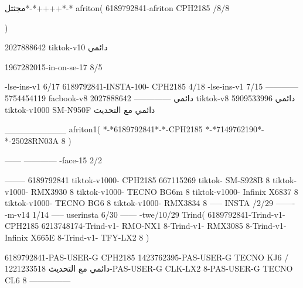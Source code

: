 مجثثل*-*++++*-*
afriton(
6189792841-afriton CPH2185  /8/8

)

2027888642 tiktok-v10
دائمي

1967282015-in-on-se-17 8/5

-lse-ins-v1 6/17
6189792841-INSTA-100- CPH2185 4/18
-lse-ins-v1 7/15
------------
5754454119 facbook-v8
دائمي
--------------
2027888642 tiktok-v8
دائمي
5909533996 tiktok-v1000  SM-N950F
دائمي مع التحديث

__________
afriton1(
*-*6189792841*-*-CPH2185
*-*7149762190*-*-25028RN03A  8
)


------
------------
-face-15 2/2

--------
6189792841 tiktok-v1000- CPH2185 
667115269 tiktok- SM-S928B  8 tiktok-v1000- RMX3930  8 tiktok-v1000- TECNO BG6m  8 tiktok-v1000- Infinix X6837  8 tiktok-v1000- TECNO BG6  8 tiktok-v1000- RMX3834  8\9
-----
 INSTA /2/29
-------
-m-v14 1/14
-----
userinsta 6/30
------
-twe/10/29
Trind(
6189792841-Trind-v1- CPH2185 
6213748174-Trind-v1-  RMO-NX1  8-Trind-v1-  RMX3085  8-Trind-v1-  Infinix X665E  8-Trind-v1-  TFY-LX2  8\6
)


6189792841-PAS-USER-G CPH2185 
1423762395-PAS-USER-G TECNO KJ6  /دائمي مع التحديث
1221233518-PAS-USER-G CLK-LX2 8-PAS-USER-G TECNO CL6 8\8
    ---------------
